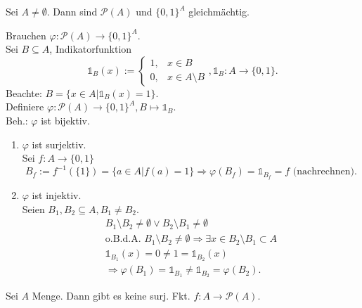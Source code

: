 \documentclass[../ana1.tex]{subfiles}
\begin{document}
\begin{lem}
	Sei \(A\neq\emptyset{}\). Dann sind \( \mathcal{P}(A) \) und \( {\{0,1\}}^A \) gleichmächtig.
\end{lem}
\begin{bew}
	Brauchen \(\varphi : \mathcal{P}(A) \rightarrow {\{0,1\}}^A \).\\
	Sei \(B \subseteq A \), Indikatorfunktion \[ \mathds{1}_B(x) := \begin{cases}
			1, & x\in B            \\
			0, & x\in A\setminus B
		\end{cases}
		, \mathds{1}_B : A \rightarrow \{0,1\}. \]
	Beachte: \(B = \{x\in A | \mathds{1}_B(x) = 1 \} \).\\
	Definiere \( \varphi : \mathcal{P}(A) \rightarrow {\{0,1\}}^A, B \mapsto \mathds{1}_B \).\\
	Beh.: \(\varphi \) ist bijektiv.
	\begin{enumerate}
		\item \( \varphi \) ist surjektiv.\\
		      Sei \(f: A\rightarrow \{0,1\} \)
		      \[ B_f := f^{-1} (\{1\}) = \{a \in A| f(a) = 1 \} \Rightarrow \varphi(B_f) = \mathds{1}_{B_f} = f\text{ (nachrechnen)}.\]
		\item \( \varphi \) ist injektiv.\\
		      Seien \( B_1,B_2\subseteq A, B_1 \neq B_2 \).
		      \begin{align*}
			      B_1\setminus B_2 \neq \emptyset \vee B_2\setminus B_1 \neq \emptyset                                    \\
			      \text{o.B.d.A. } B_1 \setminus B_2 \neq \emptyset \Rightarrow \exists x \in B_2 \setminus B_1 \subset A \\
			      \mathds{1}_{B_1}(x) = 0 \neq 1 = \mathds{1}_{B_2}(x)                                                    \\
			      \Rightarrow \varphi(B_1) = \mathds{1}_{B_1} \neq \mathds{1}_{B_2} = \varphi(B_2).
		      \end{align*}
	\end{enumerate}
\end{bew}

\begin{lem}
	Sei \(A\) Menge. Dann gibt es keine surj. Fkt. \(f: A\rightarrow \mathcal{P}(A) \).
\end{lem}
\end{document}
